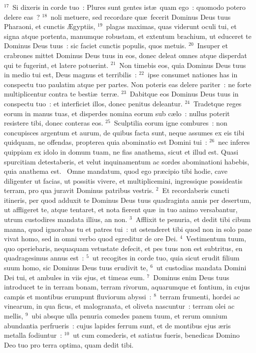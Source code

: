 ${}^{17}$~Si dixeris in corde tuo~: Plures sunt gentes ist\ae\ quam ego~: quomodo potero delere eas~?
${}^{18}$~noli metuere, sed recordare qu\ae\ fecerit Dominus Deus tuus Pharaoni, et cunctis \AE gyptiis,
${}^{19}$~plagas maximas, quas viderunt oculi tui, et signa atque portenta, manumque robustam, et extentum brachium, ut educeret te Dominus Deus tuus~: sic faciet cunctis populis, quos metuis.
${}^{20}$~Insuper et crabrones mittet Dominus Deus tuus in eos, donec deleat omnes atque disperdat qui te fugerint, et latere potuerint.
${}^{21}$~Non timebis eos, quia Dominus Deus tuus in medio tui est, Deus magnus et terribilis~:
${}^{22}$~ipse consumet nationes has in conspectu tuo paulatim atque per partes. Non poteris eas delere pariter~: ne forte multiplicentur contra te besti\ae\ terr\ae .
${}^{23}$~Dabitque eos Dominus Deus tuus in conspectu tuo~: et interficiet illos, donec penitus deleantur.
${}^{24}$~Tradetque reges eorum in manus tuas, et disperdes nomina eorum sub c\ae lo~: nullus poterit resistere tibi, donec conteras eos.
${}^{25}$~Sculptilia eorum igne combures~: non concupisces argentum et aurum, de quibus facta sunt, neque assumes ex eis tibi quidquam, ne offendas, propterea quia abominatio est Domini tui~:
${}^{26}$~nec inferes quippiam ex idolo in domum tuam, ne fias anathema, sicut et illud est. Quasi spurcitiam detestaberis, et velut inquinamentum ac sordes abominationi habebis, quia anathema est.
~\lettrine[lines=10,image=true,loversize=0.05,lraise=-0.03]{O}{}mne mandatum, quod ego pr\ae cipio tibi hodie, cave diligenter ut facias, ut possitis vivere, et multiplicemini, ingressique possideatis terram, pro qua juravit Dominus patribus vestris.
${}^{2}$~Et recordaberis cuncti itineris, per quod adduxit te Dominus Deus tuus quadraginta annis per desertum, ut affligeret te, atque tentaret, et nota fierent qu\ae\ in tuo animo versabantur, utrum custodires mandata illius, an non.
${}^{3}$~Afflixit te penuria, et dedit tibi cibum manna, quod ignorabas tu et patres tui~: ut ostenderet tibi quod non in solo pane vivat homo, sed in omni verbo quod egreditur de ore Dei.
${}^{4}$~Vestimentum tuum, quo operiebaris, nequaquam vetustate defecit, et pes tuus non est subtritus, en quadragesimus annus est~:
${}^{5}$~ut recogites in corde tuo, quia sicut erudit filium suum homo, sic Dominus Deus tuus erudivit te,
${}^{6}$~ut custodias mandata Domini Dei tui, et ambules in viis ejus, et timeas eum.
${}^{7}$~Dominus enim Deus tuus introducet te in terram bonam, terram rivorum, aquarumque et fontium, in cujus campis et montibus erumpunt fluviorum abyssi~:
${}^{8}$~terram frumenti, hordei ac vinearum, in qua ficus, et malogranata, et oliveta nascuntur~: terram olei ac mellis,
${}^{9}$~ubi absque ulla penuria comedes panem tuum, et rerum omnium abundantia perfrueris~: cujus lapides ferrum sunt, et de montibus ejus \ae ris metalla fodiuntur~:
${}^{10}$~ut cum comederis, et satiatus fueris, benedicas Domino Deo tuo pro terra optima, quam dedit tibi.


